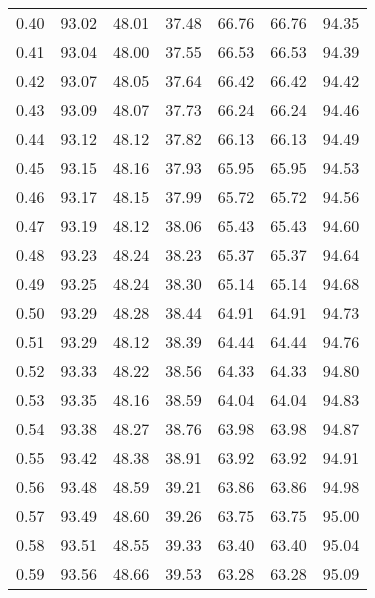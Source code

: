 \begin{tabular}{|c|c|c|c|c|c|c|}
      0.40 &     93.02 &     48.01 &      37.48 &   66.76 &      66.76 &         94.35 \\
      0.41 &     93.04 &     48.00 &      37.55 &   66.53 &      66.53 &         94.39 \\
      0.42 &     93.07 &     48.05 &      37.64 &   66.42 &      66.42 &         94.42 \\
      0.43 &     93.09 &     48.07 &      37.73 &   66.24 &      66.24 &         94.46 \\
      0.44 &     93.12 &     48.12 &      37.82 &   66.13 &      66.13 &         94.49 \\
      0.45 &     93.15 &     48.16 &      37.93 &   65.95 &      65.95 &         94.53 \\
      0.46 &     93.17 &     48.15 &      37.99 &   65.72 &      65.72 &         94.56 \\
      0.47 &     93.19 &     48.12 &      38.06 &   65.43 &      65.43 &         94.60 \\
      0.48 &     93.23 &     48.24 &      38.23 &   65.37 &      65.37 &         94.64 \\
      0.49 &     93.25 &     48.24 &      38.30 &   65.14 &      65.14 &         94.68 \\
      0.50 &     93.29 &     48.28 &      38.44 &   64.91 &      64.91 &         94.73 \\
      0.51 &     93.29 &     48.12 &      38.39 &   64.44 &      64.44 &         94.76 \\
      0.52 &     93.33 &     48.22 &      38.56 &   64.33 &      64.33 &         94.80 \\
      0.53 &     93.35 &     48.16 &      38.59 &   64.04 &      64.04 &         94.83 \\
      0.54 &     93.38 &     48.27 &      38.76 &   63.98 &      63.98 &         94.87 \\
      0.55 &     93.42 &     48.38 &      38.91 &   63.92 &      63.92 &         94.91 \\
      0.56 &     93.48 &     48.59 &      39.21 &   63.86 &      63.86 &         94.98 \\
      0.57 &     93.49 &     48.60 &      39.26 &   63.75 &      63.75 &         95.00 \\
      0.58 &     93.51 &     48.55 &      39.33 &   63.40 &      63.40 &         95.04 \\
      0.59 &     93.56 &     48.66 &      39.53 &   63.28 &      63.28 &         95.09 \\

\end{tabular}
